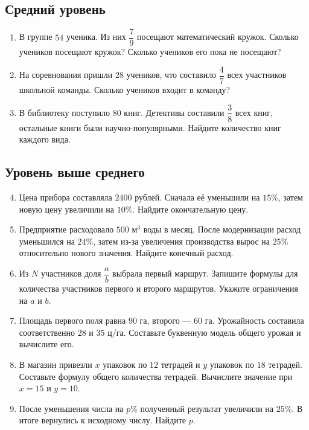 \documentclass[a4paper,12pt]{article}
\begin{document}
\subsection*{Средний уровень}

\begin{enumerate}
  \item В группе \(54\) ученика. Из них \(\dfrac{7}{9}\) посещают математический кружок. Сколько учеников посещают кружок? Сколько учеников его пока не посещают?
  \item На соревнования пришли \(28\) учеников, что составило \(\dfrac{4}{7}\) всех участников школьной команды. Сколько учеников входит в команду?
  \item В библиотеку поступило \(80\) книг. Детективы составили \(\dfrac{3}{8}\) всех книг, остальные книги были научно-популярными. Найдите количество книг каждого вида.
\end{enumerate}

\subsection*{Уровень выше среднего}

\begin{enumerate}
  \setcounter{enumi}{3}
  \item Цена прибора составляла \(2400\) рублей. Сначала её уменьшили на \(15\%\), затем новую цену увеличили на \(10\%\). Найдите окончательную цену.
  \item Предприятие расходовало \(500\) м\(^3\) воды в месяц. После модернизации расход уменьшился на \(24\%\), затем из-за увеличения производства вырос на \(25\%\) относительно нового значения. Найдите конечный расход.
  \item Из \(N\) участников доля \(\dfrac{a}{b}\) выбрала первый маршрут. Запишите формулы для количества участников первого и второго маршрутов. Укажите ограничения на \(a\) и \(b\).
  \item Площадь первого поля равна \(90\) га, второго --- \(60\) га. Урожайность составила соответственно \(28\) и \(35\) ц/га. Составьте буквенную модель общего урожая и вычислите его.
  \item В магазин привезли \(x\) упаковок по \(12\) тетрадей и \(y\) упаковок по \(18\) тетрадей. Составьте формулу общего количества тетрадей. Вычислите значение при \(x=15\) и \(y=10\).
  \item После уменьшения числа на \(p\%\) полученный результат увеличили на \(25\%\). В итоге вернулись к исходному числу. Найдите \(p\).
\end{enumerate}
\end{document}
